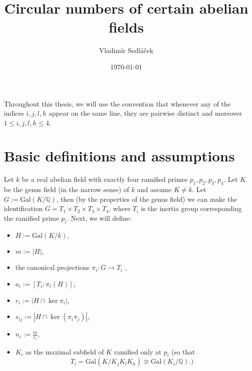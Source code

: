 \documentclass[12pt,a4paper]{article}
\newcommand{\Q}{\mathbb{Q}}
\newcommand{\Gal}{\mathrm{Gal}}
\begin{document}
\addtolength{\topmargin}{-30 pt}                   %
\setlength{\headsep}{10 pt}                      %
\renewcommand{\headrulewidth}{1 pt}                %

\title{Circular numbers of certain abelian fields}
\author{Vladimír Sedláček}
\date{\today}
\maketitle

Throughout this thesis, we will use the convention that whenever any of the indices $i,j,l,h$ appear on the same line, they are pairwise distinct and moreover $1\leq i,j,l,h\leq 4$.

\section{Basic definitions and assumptions}
Let $k$ be a real abelian field with exactly four ramified primes $p_1,p_2,p_3,p_4$. Let $K$ be the genus field (in the narrow sense) of $k$ and assume $K\neq k$. Let $G:=\Gal(K/\Q)$, then (by the properties of the genus field) we can make the identification $G=T_1\times T_2\times T_3\times T_4$, where $T_i$ is the inertia group corresponding the ramified prime $p_i$. Next, we will define:

\begin{itemize}
\item $H:=\Gal(K/k)$, 
\item $m:=|H|,$
\item the canonical projections $\pi_i:G\to T_i$ ,
\item $a_i:=[T_i:\pi_i(H)]$,
\item $r_i:=|H\cap \ker \pi_i|$,
\item $s_{ij}:=|H\cap \ker (\pi_i\pi_j)|$,
\item $n_i:=\frac{m}{r_i}$,
\item $K_i$ as the maximal subfield of $K$ ramified only at $p_i$ (so that $$T_i=\Gal(K/K_jK_lK_h)\cong \Gal(K_i/\Q).)$$
\end{itemize}
\end{document}
